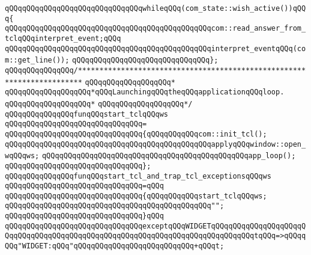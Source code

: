 \verb|qQQqqQQqqQQqqQQqqQQqqQQqqQQqqQQqwhileqQQq(com_state::wish_active())qQQq{|\newline
\newline
\verb|qQQqqQQqqQQqqQQqqQQqqQQqqQQqqQQqqQQqqQQqqQQqqQQqcom::read_answer_from_tclqQQqinterpret_event;qQQq|\newline
\verb|qQQqqQQqqQQqqQQqqQQqqQQqqQQqqQQqqQQqqQQqqQQqqQQqinterpret_eventqQQq(com::get_line());|\newline
\verb|qQQqqQQqqQQqqQQqqQQqqQQqqQQqqQQq};|\newline
\newline
\verb|qQQqqQQqqQQqqQQq/***********************************************************************|\newline
\verb|qQQqqQQqqQQqqQQqqQQq*|\newline
\verb|qQQqqQQqqQQqqQQqqQQq*qQQqLaunchingqQQqtheqQQqapplicationqQQqloop.|\newline
\verb|qQQqqQQqqQQqqQQqqQQq*|\newline
\verb|qQQqqQQqqQQqqQQqqQQq*/|\newline
\newline
\newline
\verb|qQQqqQQqqQQqqQQqfunqQQqstart_tclqQQqws|\newline
\verb|qQQqqQQqqQQqqQQqqQQqqQQqqQQqqQQq=|\newline
\verb|qQQqqQQqqQQqqQQqqQQqqQQqqQQqqQQq{qQQqqQQqqQQqcom::init_tcl();|\newline
\verb|qQQqqQQqqQQqqQQqqQQqqQQqqQQqqQQqqQQqqQQqqQQqqQQqapplyqQQqwindow::open_wqQQqws;|\newline
\verb|qQQqqQQqqQQqqQQqqQQqqQQqqQQqqQQqqQQqqQQqqQQqqQQqapp_loop();|\newline
\verb|qQQqqQQqqQQqqQQqqQQqqQQqqQQqqQQq};|\newline
\newline
\verb|qQQqqQQqqQQqqQQqfunqQQqstart_tcl_and_trap_tcl_exceptionsqQQqws|\newline
\verb|qQQqqQQqqQQqqQQqqQQqqQQqqQQqqQQq=qQQq|\newline
\verb|qQQqqQQqqQQqqQQqqQQqqQQqqQQqqQQq{qQQqqQQqqQQqstart_tclqQQqws;|\newline
\verb|qQQqqQQqqQQqqQQqqQQqqQQqqQQqqQQqqQQqqQQqqQQqqQQq"";|\newline
\verb|qQQqqQQqqQQqqQQqqQQqqQQqqQQqqQQq}qQQq|\newline
\verb|qQQqqQQqqQQqqQQqqQQqqQQqqQQqqQQqexceptqQQqWIDGETqQQqqQQqqQQqqQQqqQQqqQQqqQQqqQQqqQQqqQQqqQQqqQQqqQQqqQQqqQQqqQQqqQQqqQQqqQQqqQQqtqQQq=>qQQqqQQq"WIDGET:qQQq"qQQqqQQqqQQqqQQqqQQqqQQqqQQq+qQQqt;|\newline
